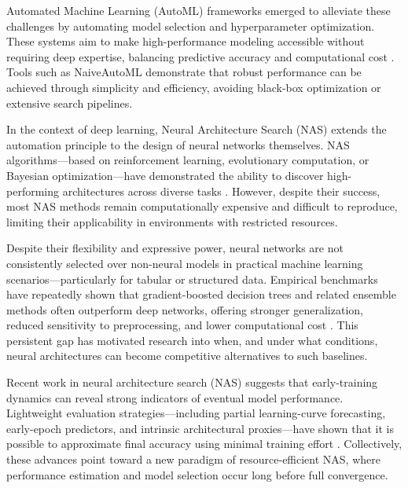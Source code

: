 \documentclass[stu,12pt,floatsintext,doublespacing]{apa7}
\begin{document}
Automated Machine Learning (AutoML) frameworks emerged to alleviate these challenges by automating model selection and hyperparameter optimization. These systems aim to make high-performance modeling accessible without requiring deep expertise, balancing predictive accuracy and computational cost \parencite{Elsken2019NeuralSurvey, Mohr2023NaiveLearning}. Tools such as NaiveAutoML demonstrate that robust performance can be achieved through simplicity and efficiency, avoiding black-box optimization or extensive search pipelines.

In the context of deep learning, Neural Architecture Search (NAS) extends the automation principle to the design of neural networks themselves. NAS algorithms—based on reinforcement learning, evolutionary computation, or Bayesian optimization—have demonstrated the ability to discover high-performing architectures across diverse tasks \parencite{Ren2022ASearch, Poyser2024NeuralApplications}. However, despite their success, most NAS methods remain computationally expensive and difficult to reproduce, limiting their applicability in environments with restricted resources.

Despite their flexibility and expressive power, neural networks are not consistently selected over non-neural models in practical machine learning scenarios—particularly for tabular or structured data. Empirical benchmarks have repeatedly shown that gradient-boosted decision trees and related ensemble methods often outperform deep networks, offering stronger generalization, reduced sensitivity to preprocessing, and lower computational cost \parencite{Oyallon2022WhyTreeBased,Borisov2022DeepSurvey,WhenDoNNsOutperform2023,DeepLearningTabularIsNotAll2021}. This persistent gap has motivated research into when, and under what conditions, neural architectures can become competitive alternatives to such baselines.

Recent work in neural architecture search (NAS) suggests that early-training dynamics can reveal strong indicators of eventual model performance. Lightweight evaluation strategies—including partial learning-curve forecasting, early-epoch predictors, and intrinsic architectural proxies—have shown that it is possible to approximate final accuracy using minimal training effort \parencite{Ru2021SpeedyPerformance,Wen2020NeuralPredictor,Luo2020SemiNAS,Chen2021BNNAS}. Collectively, these advances point toward a new paradigm of resource-efficient NAS, where performance estimation and model selection occur long before full convergence.
\end{document}
